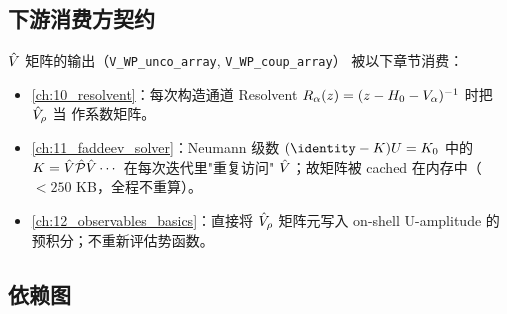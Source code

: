 \subsection{下游消费方契约}
\label{subsec:ch08-downstream}

\(\hat{V}\) 矩阵的输出（\texttt{V\_WP\_unco\_array}, \texttt{V\_WP\_coup\_array}）
被以下章节消费：

\begin{itemize}
  \item \cref{ch:10_resolvent}：每次构造通道 Resolvent
        \(R_{\alpha}(z) = (z - H_0 - V_\alpha)^{-1}\) 时把 \(\hat{V}_\rho\) 当
        作系数矩阵。
  \item \cref{ch:11_faddeev_solver}：Neumann 级数 \((\identity - K) U = K_0\)
        中的 \(K = \hat{V} \hat{\mathcal{P}} \hat{V} \cdots\) 在每次迭代里"重复访问"
        \(\hat{V}\)；故矩阵被 cached 在内存中（\(< 250\) KB，全程不重算）。
  \item \cref{ch:12_observables_basics}：直接将 \(\hat{V}_\rho\) 矩阵元写入
        on-shell U-amplitude 的预积分；不重新评估势函数。
\end{itemize}

\subsection{依赖图}
\label{subsec:ch08-callgraph}

